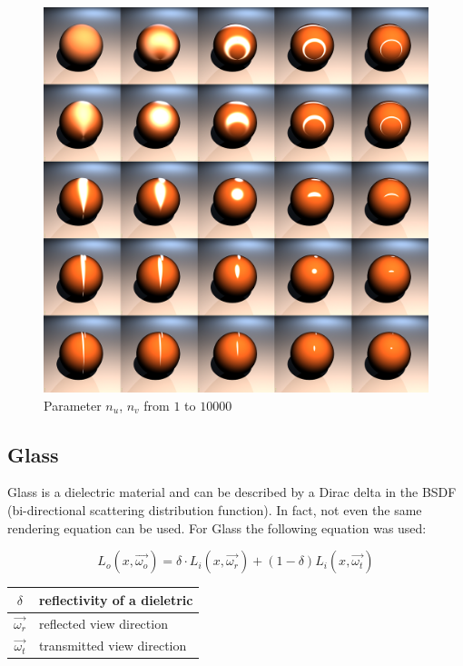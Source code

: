 \documentclass[11pt,a4paper]{article}
\begin{document}
\begin{figure}[H]

\includegraphics[width=\textwidth]{ashuvcomplete.png}
\caption{Parameter $n_u$, $n_v$ from $1$ to $10000$}
\end{figure}


\newpage
\subsection{Glass}

Glass is a dielectric material and can be described by a Dirac delta in the BSDF (bi-directional scattering distribution function). In fact, not even the same rendering equation can be used.
For Glass the following equation was used:

\begin{equation}
L_o(x,\vec{\omega_o})= \delta \cdot L_i(x,\vec{\omega_r}) + (1-\delta) L_i(x,\vec{\omega_t})
\end{equation}

\begin{table}[H]
\begin{tabular}{| c | l |}
\hline
$\delta$ & reflectivity of a dieletric\\ \hline
$\vec{\omega_r}$ & reflected view direction\\ \hline
$\vec{\omega_t}$ & transmitted view direction\\ \hline
\end{tabular}
\end{table}
\end{document}
